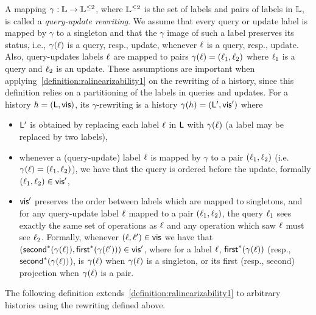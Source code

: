 A mapping $\gamma:\mathbb{L}\rightarrow \mathbb{L}^{\leq 2}$, where $\mathbb{L}^{\leq 2}$ is the set of labels and pairs of labels in $\mathbb{L}$, is called a \emph{query-update rewriting}.
We assume that every query or update label is mapped by $\gamma$ to a singleton and that the $\gamma$ image of such a label preserves its status, i.e., $\gamma(\ell)$ is a query, resp., update, whenever $\ell$ is a query, resp., update. Also, query-updates labels $\ell$ are mapped to pairs $\gamma(\ell)=(\ell_1,\ell_2)$ where $\ell_1$ is a query and $\ell_2$ is an update. These assumptions are important when applying~\autoref{definition:ralinearizability1} on the rewriting of a history, since this definition relies on a partitioning of the labels in queries and updates.
For a history $h=(\mathsf{L},\mathsf{vis})$, its $\gamma$-rewriting is a
history $\gamma(h)=(\mathsf{L}',\mathsf{vis}')$ where
\begin{itemize}
\item $\mathsf{L}'$ is obtained by replacing each label $\ell$ in
  $\mathsf{L}$ with $\gamma(\ell)$ (a label may be replaced by two
  labels),
\item whenever a (query-update) label $\ell$ is mapped by $\gamma$
  to a pair $(\ell_1,\ell_2)$ (i.e.
  $\gamma(\ell)=(\ell_1,\ell_2)$), we have that the query is
  ordered before the update, formally $(\ell_1,\ell_2)\in \mathsf{vis}'$,
\item $\mathsf{vis}'$ preserves the order between labels which are
  mapped to singletons, and
  for any query-update label $\ell$ mapped to a pair
 $(\ell_1,\ell_2)$, the query $\ell_1$ sees exactly the same
 set of operations as $\ell$ and any operation which saw $\ell$
 must see $\ell_2$.
 Formally, whenever $(\ell,\ell')\in\mathsf{vis}$ we have that
 $(\mathsf{second}^*(\gamma(\ell)),
 \mathsf{first}^*(\gamma(\ell')))\in\mathsf{vis}'$, where for a label $\ell$,
 $\mathsf{first}^*(\gamma(\ell))$ (resp., $\mathsf{second}^*(\gamma(\ell))$), is
 $\gamma(\ell)$ when $\gamma(\ell)$ is a singleton, or its first (resp.,
 second) projection when $\gamma(\ell)$ is a pair.
\end{itemize}
The following definition
extends~\autoref{definition:ralinearizability1} to arbitrary histories
using the rewriting defined above.

